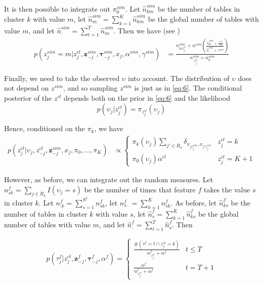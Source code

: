 \documentclass[12pt]{article}
\begin{document}
It is then possible to integrate out $\pi^{sim}_0$.  Let $\hat{n}^{sim}_{km}$ be the number of tables in cluster $k$ with value $m$, let $\hat{n}^{sim}_{m} = \sum_{k=1}^K \hat{n}^{sim}_{km}$ be the global number of tables with value $m$, and let $\hat{n}^{sim}_{\cdot} = \sum_{t=1}^T \hat{n}^{sim}_{m}$.  Then we have (see \cite{wallach2009rethinking})
\begin{align}
  \label{eq:6}
  p(z^{sim}_{j} = m \vert z^{cl}_{j}, \mathbf{z}^{sim}_{-j}, \boldsymbol{\tau}^{sim}_{-j}, x_{j}, \alpha^{sim}, \gamma^{sim}) &= \frac{n^{sim}_{mz^{cl}_j} + \alpha^{sim} \left(\frac{\hat{n}^{sim}_{m} + \frac{\gamma^{sim}}{M}}{\hat{n}^{sim}_{\cdot} + \gamma^{sim}}\right)}{n^{sim}_{\cdot z^{cl}_j} + \alpha_0^{sim}}
\end{align}

Finally, we need to take the observed $\upsilon$ into account.  The distribution of $\upsilon$ does not depend on $z^{sim}$, and so sampling $z^{sim}$ is just as in \eqref{eq:6}.  The conditional posterior of the $z^{cl}$ depends both on the prior in \eqref{eq:6} and the likelihood
\begin{equation}
  \label{eq:8}
  p(\upsilon_{j} \vert z^{cl}_j) = \pi_{z^{cl}_j}(\upsilon_j)
\end{equation}

Hence, conditioned on the $\pi_k$, we have
\begin{align}
p(z^{cl}_{j} \vert \upsilon_j, z^{cl}_{-j}, \mathbf{z}^{sim}_{-j}, x_{j}, \pi_0,\dots,\pi_K) &\propto
  \begin{cases}
    \pi_k(\upsilon_j) \sum_{j' \in R_k} \delta_{x_{jz^{sim}_{j'}},x_{j'z^{sim}_{j'}}} & z^{cl}_{j} = k \\
    \pi_0(\upsilon_j) \alpha^{cl} & z^{cl}_{j} = K+1
  \end{cases}
\end{align}

However, as before, we can integrate out the random measures.  Let $n^{f}_{sk} = \sum_{j \in R_k} I(\upsilon_j = s)$ be the number of times that feature $f$ takes the value $s$ in cluster $k$.  Let $n^{f}_{\cdot k} = \sum_{s=1}^{S^f} n^f_{sk}$, let $n^{f}_{s\cdot} = \sum_{k=1}^K n^f_{sk}$.  As before, let $\hat{n}^{f}_{ks}$ be the number of tables in cluster $k$ with value $s$, let $\hat{n}^{f}_{s} = \sum_{k=1}^K \hat{n}^{f}_{ks}$ be the global number of tables with value $m$, and let $\hat{n}^{f}_{\cdot} = \sum_{t=1}^T \hat{n}^{f}_{s}$.  Then

\begin{equation}
  \label{eq:9}
  p(\tau^{f}_j \vert z^{cl}_{j}, \mathbf{z}^{f}_{-j}, \boldsymbol{\tau}^{f}_{-j}, \alpha^{f}) = 
  \begin{cases}
    \frac{\#(\tau^{f} = t \cap z^{cl}_j = k)}{n^{f}_{\cdot z^{cl}_j} + \alpha^{f}} & t \leq T \\
    \frac{\alpha^{f}}{n^{f}_{\cdot z^{cl}_j} + \alpha^{f}} & t = T+1
  \end{cases}
\end{equation}
\end{document}
